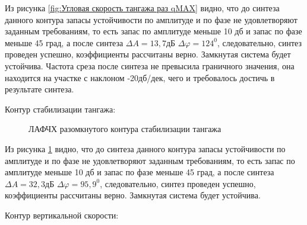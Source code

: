 Из рисунка \ref{fig:Угловая скорость тангажа раз qMAX} видно, что до синтеза данного контура запасы устойчивости по амплитуде и по фазе не удовлетворяют заданным требованиям, то есть запас по амплитуде меньше 10 дб и запас по фазе меньше 45 град, а после синтеза $\Delta A = 13,7 $дБ $\Delta \varphi = 124^0$, следовательно, синтез проведен успешно, коэффициенты рассчитаны верно. Замкнутая система будет устойчива. Частота среза после синтеза не превысила граничного значения, она находится на участке с наклоном -20дб/дек, чего и требовалось достичь в результате синтеза.  

\begin{center}
    Контур стабилизации тангажа:
\end{center}

\begin{figure}[H]
    \caption{ЛАФЧХ разомкнутого контура стабилизации тангажа}
    \label{fig:Тангаж раз qMAX}
\end{figure}

Из рисунка \ref{fig:Тангаж раз qMAX} видно, что до синтеза данного контура запасы устойчивости по амплитуде и по фазе не удовлетворяют заданным требованиям, то есть запас по амплитуде меньше 10 дб и запас по фазе меньше 45 град, а после синтеза $\Delta A = 32,3 $дБ $\Delta \varphi = 95,9^0$, следовательно, синтез проведен успешно, коэффициенты рассчитаны верно. Замкнутая система будет устойчива.  

\begin{center}
    Контур вертикальной скорости:
\end{center}

